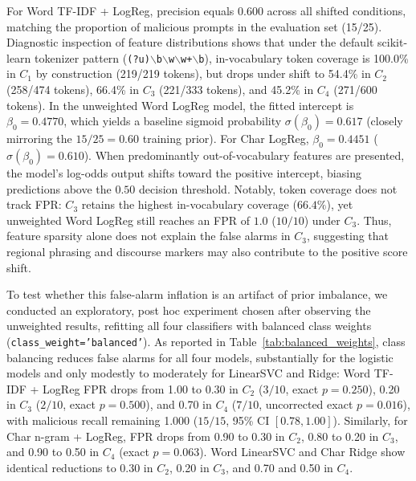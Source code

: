 \documentclass[conference]{IEEEtran}
\begin{document}
For Word TF-IDF + LogReg, precision equals 0.600 across all shifted conditions, matching the proportion of malicious prompts in the evaluation set (15/25). Diagnostic inspection of feature distributions shows that under the default scikit-learn tokenizer pattern (\texttt{(?u)$\backslash$b$\backslash$w$\backslash$w+$\backslash$b}), in-vocabulary token coverage is 100.0\% in $C_1$ by construction (219/219 tokens), but drops under shift to 54.4\% in $C_2$ (258/474 tokens), 66.4\% in $C_3$ (221/333 tokens), and 45.2\% in $C_4$ (271/600 tokens). In the unweighted Word LogReg model, the fitted intercept is $\beta_0 = 0.4770$, which yields a baseline sigmoid probability $\sigma(\beta_0) = 0.617$ (closely mirroring the $15/25 = 0.60$ training prior). For Char LogReg, $\beta_0 = 0.4451$ ($\sigma(\beta_0) = 0.610$). When predominantly out-of-vocabulary features are presented, the model's log-odds output shifts toward the positive intercept, biasing predictions above the $0.50$ decision threshold. Notably, token coverage does not track FPR: $C_3$ retains the highest in-vocabulary coverage ($66.4\%$), yet unweighted Word LogReg still reaches an FPR of $1.0$ ($10/10$) under $C_3$. Thus, feature sparsity alone does not explain the false alarms in $C_3$, suggesting that regional phrasing and discourse markers may also contribute to the positive score shift.

To test whether this false-alarm inflation is an artifact of prior imbalance, we conducted an exploratory, post hoc experiment chosen after observing the unweighted results, refitting all four classifiers with balanced class weights (\texttt{class\_weight='balanced'}). As reported in Table~\ref{tab:balanced_weights}, class balancing reduces false alarms for all four models, substantially for the logistic models and only modestly to moderately for LinearSVC and Ridge: Word TF-IDF + LogReg FPR drops from 1.00 to 0.30 in $C_2$ ($3/10$, exact $p = 0.250$), 0.20 in $C_3$ ($2/10$, exact $p = 0.500$), and 0.70 in $C_4$ ($7/10$, uncorrected exact $p = 0.016$), with malicious recall remaining 1.000 ($15/15$, 95\% CI $[0.78, 1.00]$). Similarly, for Char n-gram + LogReg, FPR drops from 0.90 to 0.30 in $C_2$, 0.80 to 0.20 in $C_3$, and 0.90 to 0.50 in $C_4$ (exact $p = 0.063$). Word LinearSVC and Char Ridge show identical reductions to 0.30 in $C_2$, 0.20 in $C_3$, and 0.70 and 0.50 in $C_4$. 
\end{document}
